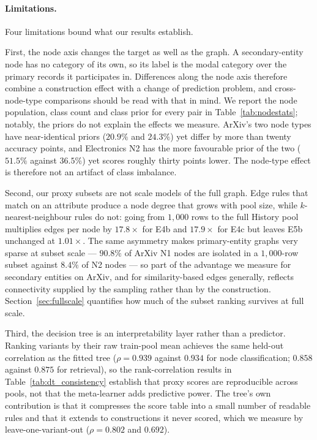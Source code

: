 %
%

\paragraph{Limitations.}
Four limitations bound what our results establish.

First, the node axis changes the target as well as the graph. A secondary-entity
node has no category of its own, so its label is the modal category over the
primary records it participates in. Differences along the node axis therefore
combine a construction effect with a change of prediction problem, and
cross-node-type comparisons should be read with that in mind. We report the
node population, class count and class prior for every pair in
Table~\ref{tab:nodestats}; notably, the priors do not explain the effects we
measure. ArXiv's two node types have near-identical priors ($20.9\%$ and
$24.3\%$) yet differ by more than twenty accuracy points, and Electronics N2
has the more favourable prior of the two ($51.5\%$ against $36.5\%$) yet scores
roughly thirty points lower. The node-type effect is therefore not an artifact
of class imbalance.

Second, our proxy subsets are not scale models of the full graph. Edge rules
that match on an attribute produce a node degree that grows with pool size,
while $k$-nearest-neighbour rules do not: going from $1{,}000$ rows to the full
History pool multiplies edges per node by $17.8\times$ for E4b and $17.9\times$
for E4c but leaves E5b unchanged at $1.01\times$. The same asymmetry makes
primary-entity graphs very sparse at subset scale --- $90.8\%$ of ArXiv N1 nodes
are isolated in a $1{,}000$-row subset against $8.4\%$ of N2 nodes --- so part
of the advantage we measure for secondary entities on ArXiv, and for
similarity-based edges generally, reflects connectivity supplied by the
sampling rather than by the construction. Section~\ref{sec:fullscale} quantifies
how much of the subset ranking survives at full scale.

Third, the decision tree is an interpretability layer rather than a predictor.
Ranking variants by their raw train-pool mean achieves the same held-out
correlation as the fitted tree ($\rho = 0.939$ against $0.934$ for node
classification; $0.858$ against $0.875$ for retrieval), so the rank-correlation
results in Table~\ref{tab:dt_consistency} establish that proxy scores are
reproducible across pools, not that the meta-learner adds predictive power. The
tree's own contribution is that it compresses the score table into a small
number of readable rules and that it extends to constructions it never scored,
which we measure by leave-one-variant-out ($\rho = 0.802$ and $0.692$).

